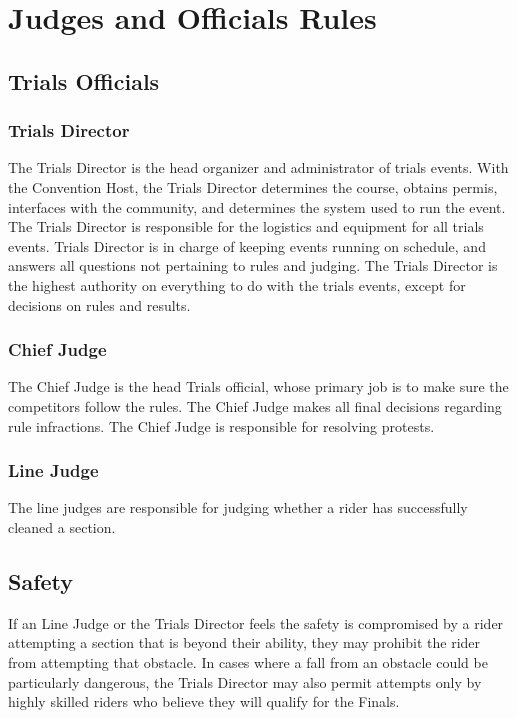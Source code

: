 \chapter{Judges and Officials Rules}

\section{Trials Officials}

\subsection{Trials Director}

The Trials Director is the head organizer and administrator of trials events.
With the Convention Host, the Trials Director determines the course, obtains permis, interfaces with the community, and determines the system used to run the event.
The Trials Director is responsible for the logistics and equipment for all trials events.
Trials Director is in charge of keeping events running on schedule, and answers all questions not pertaining to rules and judging.
The Trials Director is the highest authority on everything to do with the trials events, except for decisions on rules and results.

\subsection{Chief Judge}

The Chief Judge is the head Trials official, whose primary job is to make sure the competitors follow the rules.
The Chief Judge makes all final decisions regarding rule infractions.
The Chief Judge is responsible for resolving protests.

\subsection{Line Judge}

The line judges are responsible for judging whether a rider has successfully cleaned a section.

\section{Safety}

If an Line Judge or the Trials Director feels the safety is compromised by a rider attempting a section that is beyond their ability, they may prohibit the rider from attempting that obstacle.
In cases where a fall from an obstacle could be particularly dangerous, the Trials Director may also permit attempts only by highly skilled riders who believe they will qualify for the Finals.

